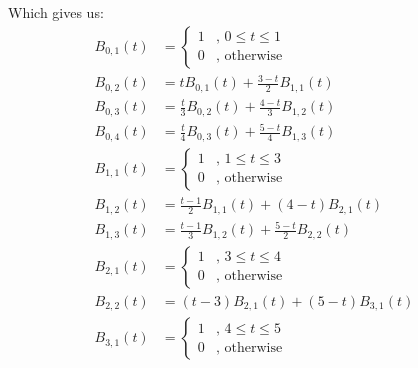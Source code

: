 \documentclass[a4paper,10pt]{article}
\begin{document}
\noindent
Which gives us:
\begin{equation}
\left.\begin{aligned}
B_{0, 1}(t) &=
\begin{cases}
   1 & \text{, } 0 \leq t \leq 1 \\
   0 & \text{, otherwise}
  \end{cases}& \\
B_{0,2}(t) &= tB_{0,1}(t) + \frac{3-t}{2}B_{1,1}(t)& \\
B_{0,3}(t) &= \frac{t}{3}B_{0,2}(t) + \frac{4-t}{3}B_{1,2}(t)& \\
B_{0,4}(t) &= \frac{t}{4}B_{0,3}(t) + \frac{5-t}{4}B_{1,3}(t)&\\
B_{1,1}(t) &= \begin{cases}
   1 & \text{, } 1 \leq t \leq 3 \\
   0 & \text{, otherwise}
  \end{cases}&\\
    B_{1,2}(t) &= \frac{t-1}{2}B_{1,1}(t) + (4-t)B_{2,1}(t)& \\
B_{1,3}(t) &= \frac{t-1}{3}B_{1,2}(t) + \frac{5-t}{2}B_{2,2}(t)& \\
B_{2,1}(t) &= \begin{cases}
   1 & \text{, } 3 \leq t \leq 4 \\
   0 & \text{, otherwise}
  \end{cases}&\\
    B_{2,2}(t) &= (t-3)B_{2,1}(t) + (5-t)B_{3,1}(t)& \\
B_{3,1}(t) &= \begin{cases}
   1 & \text{, } 4 \leq t \leq 5 \\
   0 & \text{, otherwise}
  \end{cases}&\\\\
\end{aligned}\right.
\end{equation}
\end{document}
